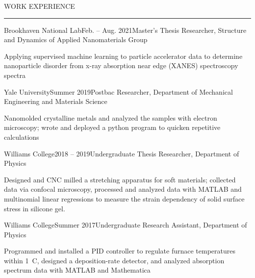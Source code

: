 \documentclass{short_resume} %
\renewenvironment{rSection}[1]{
	\sectionskip
	\textcolor{RoyalPurple}{\MakeUppercase{#1}}
	\sectionlineskip
	\hrule
	\begin{list}{}{
			\setlength{\leftmargin}{1.5em}
		}
		\item[]
	}{
	\end{list}
}
\begin{document}
\vspace{-1.75em}		
	\begin{rSection}{Work Experience}
			\begin{rSubsection}{Brookhaven National Lab}{Feb. -- Aug. 2021}{Master's Thesis Researcher, Structure and Dynamics of Applied Nanomaterials Group}{}
			\item[] Applying supervised machine learning to particle accelerator data to determine nanoparticle disorder from x-ray absorption near edge (XANES) spectroscopy spectra
			\vspace{-.2em}
		\end{rSubsection}
		\vspace{-.2em}
		\begin{rSubsection}{Yale University}{Summer 2019}{Postbac Researcher, Department of Mechanical Engineering and Materials Science}{}
			\item[] Nanomolded crystalline metals and analyzed the samples with electron microscopy; wrote and deployed a python program to quicken repetitive calculations 
			\vspace{-.2em}
		\end{rSubsection}
		\vspace{-.2em}
		\begin{rSubsection}{Williams College}{2018 -- 2019}{Undergraduate Thesis Researcher, Department of Physics}{}
			\item[] Designed and CNC milled a stretching apparatus for soft materials; collected data via confocal microscopy, processed and analyzed data with MATLAB and multinomial linear regressions to measure the strain dependency of solid surface stress in silicone gel.
		\end{rSubsection}
		\vspace{-.2em}
		\begin{rSubsection}{Williams College}{Summer 2017}{Undergraduate Research Assistant, Department of Physics}{}
			\item[] Programmed and installed a PID controller to regulate furnace temperatures within 1~\degree C, designed a deposition-rate detector, and analyzed absorption spectrum data with MATLAB and Mathematica
		\end{rSubsection}


\end{rSection}
\end{document}
